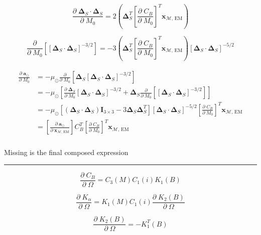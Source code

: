 \documentclass[]{article}
\newcommand{\pd}[2]{\frac{\partial\;#1}{\partial\;#2}}
\newcommand{\pddown}[2]{\frac{\partial}{\partial\;#2} \left[ #1 \right] }
\begin{document}
	\begin{equation*}
		\pd{\boldsymbol{\Delta}_S \cdot \boldsymbol{\Delta}_S}{M_0} = 2\left( \boldsymbol{\Delta}_S^T \left[ \pd{C_B}{M_0} \right]^T \mathbf{x}_{\mathcal{M}\text{, EM}} \right)
	\end{equation*}
	
	\begin{equation*}
		\pddown{ [\boldsymbol{\Delta}_S \cdot \boldsymbol{\Delta}_S]^{-3/2} }{M_0} = -3 \left( \boldsymbol{\Delta}_S^T \left[ \pd{C_B}{M_0} \right]^T \mathbf{x}_{\mathcal{M}\text{, EM}} \right) [\boldsymbol{\Delta}_S \cdot \boldsymbol{\Delta}_S]^{-5/2}
	\end{equation*}
	
	\begin{align}
	\begin{split}
		\pd{\mathbf{a}_{\odot}}{M_0} 
		&= -\mu_\odot \pddown{ \boldsymbol{\Delta}_S [\boldsymbol{\Delta}_S \cdot \boldsymbol{\Delta}_S]^{-3/2} }{M_0} \\
		&= -\mu_\odot \left[ \pd{ \boldsymbol{\Delta}_S }{M_0}[\boldsymbol{\Delta}_S \cdot \boldsymbol{\Delta}_S]^{-3/2} + \boldsymbol{\Delta}_S  \pddown{ [\boldsymbol{\Delta}_S \cdot \boldsymbol{\Delta}_S]^{-3/2} }{M_0} \right] \\
		&= -\mu_\odot \left[ (\boldsymbol{\Delta}_S \cdot \boldsymbol{\Delta}_S)\mathbf{I}_{3\times 3} - 3 \boldsymbol{\Delta}_S \boldsymbol{\Delta}_S^T \right] [\boldsymbol{\Delta}_S \cdot \boldsymbol{\Delta}_S]^{-5/2} \left[ \pd{C_B}{M_0} \right]^T \mathbf{x}_{\mathcal{M}\text{, EM}} \\
		&= \left[\pd{\mathbf{a}_{\odot}}{ \mathbf{x}_{\mathcal{M}\text{, EM}} }\right] C_B^T \left[ \pd{C_B}{M_0} \right]^T \mathbf{x}_{\mathcal{M}\text{, EM}} \\
	\end{split}
	\end{align}
	
	Missing is the final composed expression
	
	\hrule \vspace{1em}
	
	\begin{equation*}
		\pd{C_B}{\Omega} = C_3(M) C_1(i) K_1(B)
	\end{equation*}
	
	\begin{equation*}
		\pd{K_\alpha}{\Omega} = K_1(M) C_1(i) \pd{K_2(B)}{\Omega}
	\end{equation*}
	
	\begin{equation*}
		\pd{K_2(B)}{\Omega} = -K_1^T(B)
	\end{equation*}
	
\end{document}
